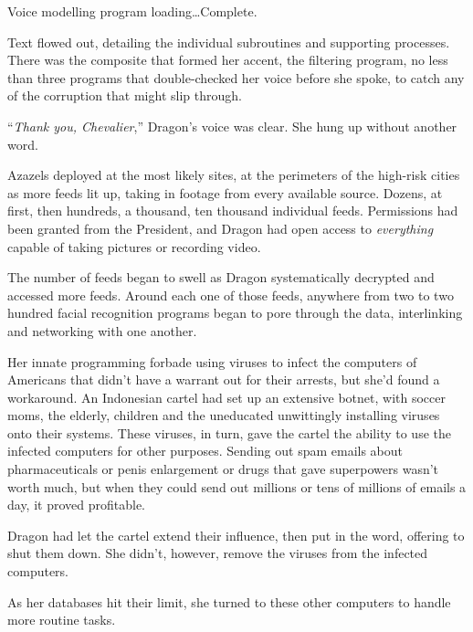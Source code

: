 Voice modelling program loading\ldots Complete.



Text flowed out, detailing the individual subroutines and supporting processes.  There was the composite that formed her accent, the filtering program, no less than three programs that double-checked her voice before she spoke, to catch any of the corruption that might slip through.



``\emph{Thank you, Chevalier},'' Dragon's voice was clear.  She hung up without another word.



Azazels deployed at the most likely sites, at the perimeters of the high-risk cities as more feeds lit up, taking in footage from every available source.  Dozens, at first, then hundreds, a thousand, ten thousand individual feeds.  Permissions had been granted from the President, and Dragon had open access to \emph{everything }capable of taking pictures or recording video.



The number of feeds began to swell as Dragon systematically decrypted and accessed more feeds.  Around each one of those feeds, anywhere from two to two hundred facial recognition programs began to pore through the data, interlinking and networking with one another.



Her innate programming forbade using viruses to infect the computers of Americans that didn't have a warrant out for their arrests, but she'd found a workaround.  An Indonesian cartel had set up an extensive botnet, with soccer moms, the elderly, children and the uneducated unwittingly installing viruses onto their systems.  These viruses, in turn, gave the cartel the ability to use the infected computers for other purposes.  Sending out spam emails about pharmaceuticals or penis enlargement or drugs that gave superpowers wasn't worth much, but when they could send out millions or tens of millions of emails a day, it proved profitable.



Dragon had let the cartel extend their influence, then put in the word, offering to shut them down.  She didn't, however, remove the viruses from the infected computers.



As her databases hit their limit, she turned to these other computers to handle more routine tasks.



